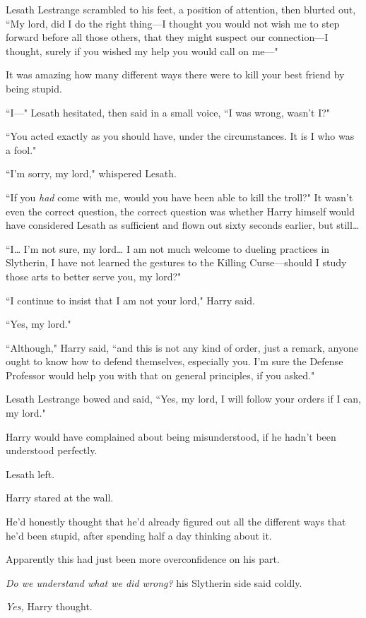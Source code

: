 Lesath Lestrange scrambled to his feet, a position of attention, then blurted out, ``My lord, did I do the right thing---I thought you would not wish me to step forward before all those others, that they might suspect our connection---I thought, surely if you wished my help you would call on me---"

It was amazing how many different ways there were to kill your best friend by being stupid.

``I---" Lesath hesitated, then said in a small voice, ``I was wrong, wasn't I?"

``You acted exactly as you should have, under the circumstances. It is I who was a fool."

``I'm sorry, my lord," whispered Lesath.

``If you \emph{had} come with me, would you have been able to kill the troll?" It wasn't even the correct question, the correct question was whether Harry himself would have considered Lesath as sufficient and flown out sixty seconds earlier, but still{\ldots}

``I{\ldots} I'm not sure, my lord{\ldots} I am not much welcome to dueling practices in Slytherin, I have not learned the gestures to the Killing Curse---should I study those arts to better serve you, my lord?"

``I continue to insist that I am not your lord," Harry said.

``Yes, my lord."

``Although," Harry said, ``and this is not any kind of order, just a remark, anyone ought to know how to defend themselves, especially you. I'm sure the Defense Professor would help you with that on general principles, if you asked."

Lesath Lestrange bowed and said, ``Yes, my lord, I will follow your orders if I can, my lord."

Harry would have complained about being misunderstood, if he hadn't been understood perfectly.

Lesath left.

Harry stared at the wall.

He'd honestly thought that he'd already figured out all the different ways that he'd been stupid, after spending half a day thinking about it.

Apparently this had just been more overconfidence on his part.

\emph{Do we understand what we did wrong?} his Slytherin side said coldly.

\emph{Yes,} Harry thought.

